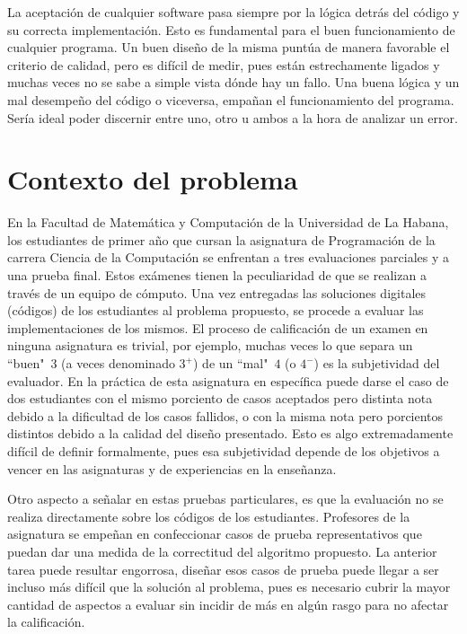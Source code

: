 \documentclass[a4paper,openright,11pt,oneside]{book}
\begin{document}
	La aceptación de cualquier software pasa siempre por la lógica detrás del código y su correcta implementación. Esto es fundamental para el buen funcionamiento de cualquier programa. Un buen diseño de la misma puntúa de manera favorable el criterio de calidad, pero es difícil de medir, pues están estrechamente ligados y muchas veces no se sabe a simple vista dónde hay un fallo. Una buena lógica y un mal desempeño del código o viceversa, empañan el funcionamiento del programa. Sería ideal poder discernir entre uno, otro u ambos a la hora de analizar un error.
		
	\section{Contexto del problema}
		
		En la Facultad de Matemática y Computación de la Universidad de La Habana, los estudiantes de primer año que cursan la asignatura de Programación de la carrera Ciencia de la Computación se enfrentan a tres evaluaciones parciales y a una prueba final. Estos exámenes tienen la peculiaridad de que se realizan a través de un equipo de cómputo. Una vez entregadas las soluciones digitales (códigos) de los estudiantes al problema propuesto, se procede a evaluar las implementaciones de los mismos. El proceso de calificación de un examen en ninguna asignatura es trivial, por ejemplo, muchas veces lo que separa un ``buen"\ $3$ (a veces denominado $3^+$) de un ``mal"\ $4$ (o $4^- $) es la subjetividad del evaluador. En la práctica de esta asignatura en específica puede darse el caso de dos estudiantes con el mismo porciento de casos aceptados pero distinta nota debido a la dificultad de los casos fallidos, o con la misma nota pero porcientos distintos debido a la calidad del diseño presentado. Esto es algo extremadamente difícil de definir formalmente, pues esa subjetividad depende de los objetivos a vencer en las asignaturas y de experiencias en la enseñanza.
		
		Otro aspecto a señalar en estas pruebas particulares, es que la evaluación no se realiza directamente sobre los códigos de los estudiantes. Profesores de la asignatura se empeñan en confeccionar casos de prueba representativos que puedan dar una medida de la correctitud del algoritmo propuesto. La anterior tarea puede resultar engorrosa, diseñar esos casos de prueba puede llegar a ser incluso más difícil que la solución al problema, pues es necesario cubrir la mayor cantidad de aspectos a evaluar sin incidir de más en algún rasgo para no afectar la calificación.
		
\end{document}
